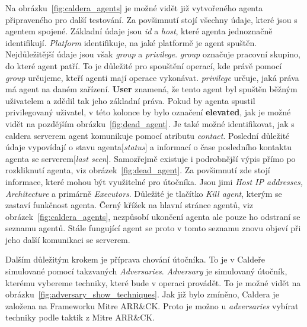 Na obrázku~\ref{fig:caldera_agents} je možné vidět již vytvořeného agenta připraveného pro další testování.
Za povšimnutí stojí všechny údaje, které jsou s agentem spojené.
Základní údaje jsou \textit{id} a \textit{host}, které agenta jednoznačně identifikují.
\textit{Platform} identifikuje, na jaké platformě je agent spuštěn.
Nejdůležitější údaje jsou však \textit{group} a \textit{privilege}.
\textit{group} označuje pracovní skupino, do které agent patří.
To je důležité pro spouštění operací, kde právě pomocí \textit{group} určujeme, kteří agenti mají operace vykonávat.
\textit{privilege} určuje, jaká práva má agent na daném zařízení.
\textbf{User} znamená, že tento agent byl spuštěn běžným uživatelem a zdědil tak jeho základní práva.
Pokud by agenta spustil privilegovaný uživatel, v této kolonce by bylo označení \textbf{elevated}, jak je možné vidět na pozdějším obrázku~\ref{fig:dead_agent}.
Je také možné identifikovat, jak s caldera serverem agent komunikuje pomocí atributu \textit{contact}.
Poslední důležité údaje vypovídají o stavu agenta[\textit{status}] a informací o čase posledního kontaktu agenta se serverem[\textit{last seen}].
Samozřejmě existuje i podrobnější výpis přímo po rozkliknutí agenta, viz obrázek~\ref{fig:dead_agent}.
Za povšimnutí zde stojí informace, které mohou být využitelné pro útočníka.
Jsou jimi \textit{Host IP addresses, Architecture} a primárně \textit{Executors}.
Důležité je tlačítko \textit{Kill agent}, kterým se zastaví funkčnost agenta.
Černý křížek na hlavní stránce agentů, viz obrázek~\ref{fig:caldera_agents}, nezpůsobí ukončení agenta ale pouze ho odstraní se seznamu agentů.
Stále fungující agent se proto v tomto seznamu znovu objeví při jeho další komunikaci se serverem.


Dalším důležitým krokem je příprava chování útočníka.
To je v Caldeře simulované pomocí takzvaných \textit{Adversaries}.
\textit{Adversary} je simulovaný útočník, kterému vybereme techniky, které bude v operaci provádět.
To je možné vidět na obrázku~\ref{fig:adversary_show_techniques}.
Jak již bylo zmíněno, Caldera je založena na Frameworku Mitre ARR\&CK\@.
Proto je možno u \textit{adversaries} vybírat techniky podle taktik z Mitre ARR\&CK\@.


